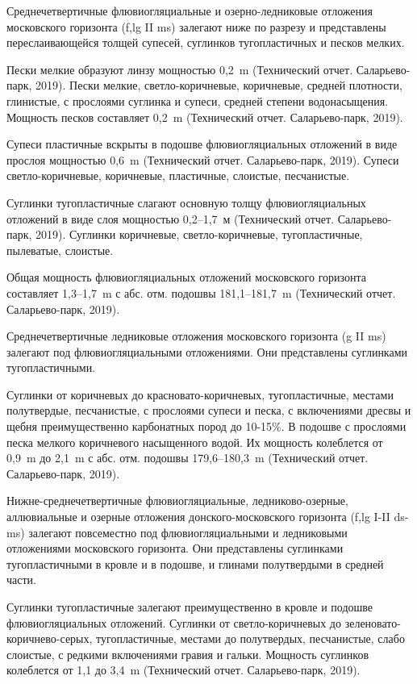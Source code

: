 Среднечетвертичные флювиогляциальные и озерно-ледниковые отложения московского горизонта 
(f,lg II ms) залегают ниже по разрезу и представлены переслаивающейся толщей супесей, суглинков 
тугопластичных и песков мелких.

Пески мелкие образуют линзу мощностью 0,2~\si{\meter} (Технический отчет. Саларьево-парк, 2019). Пески мелкие, светло-коричневые, 
коричневые, средней плотности, глинистые, с прослоями суглинка и супеси, средней степени водонасыщения. 
Мощность песков составляет 0,2~\si{\meter} (Технический отчет. Саларьево-парк, 2019).

Супеси пластичные вскрыты в подошве флювиогляциальных отложений в виде прослоя 
мощностью 0,6~\si{\meter} (Технический отчет. Саларьево-парк, 2019). 
Супеси светло-коричневые, коричневые, пластичные, слоистые, песчанистые.

Суглинки тугопластичные слагают основную толщу флювиогляциальных отложений в виде 
слоя мощностью 0,2--1,7~м (Технический отчет. Саларьево-парк, 2019). 
Суглинки коричневые, светло-коричневые, тугопластичные, пылеватые, слоистые.

Общая мощность флювиогляциальных отложений московского горизонта составляет 
1,3--1,7~\si{\meter} с абс. отм. подошвы 181,1--181,7~\si{\meter} 
(Технический отчет. Саларьево-парк, 2019).

Среднечетвертичные ледниковые отложения московского горизонта (g II ms) 
залегают под флювиогляциальными отложениями. 
Они представлены суглинками тугопластичными.

Суглинки от коричневых до красновато-коричневых, тугопластичные, местами полутвердые, 
песчанистые, с прослоями супеси и песка, с включениями дресвы и щебня преимущественно 
карбонатных пород до 10-15\%. В подошве с прослоями песка мелкого коричневого 
насыщенного водой. 
Их мощность колеблется от 0,9~\si{\meter} до 2,1~\si{\meter} с абс. отм. 
подошвы 179,6--180,3~\si{\meter} (Технический отчет. Саларьево-парк, 2019).

Нижне-среднечетвертичные флювиогляциальные, ледниково-озерные, аллювиальные и 
озерные отложения донского-московского горизонта (f,lg I-II ds-ms) залегают 
повсеместно под флювиогляциальными и ледниковыми отложениями московского горизонта. 
Они представлены суглинками тугопластичными в кровле и в подошве, 
и глинами полутвердыми в средней части.

Суглинки тугопластичные залегают преимущественно в кровле и подошве флювиогляциальных отложений.
Суглинки от светло-коричневых до зеленовато-коричнево-серых, тугопластичные, 
местами до полутвердых, песчанистые, слабо слоистые, с редкими включениями гравия и гальки. 
Мощность суглинков колеблется от 1,1 до 3,4~\si{\meter} (Технический отчет. Саларьево-парк, 2019).

